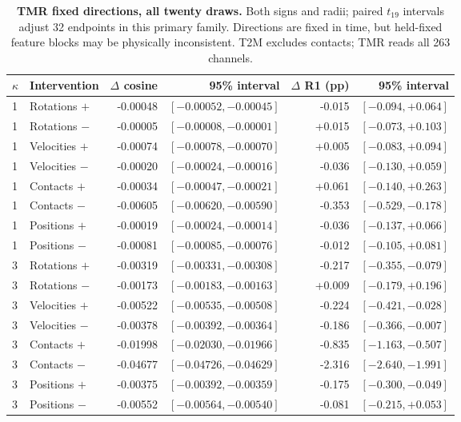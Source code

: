 \begin{table}[t]
\centering\small
\caption{\textbf{TMR fixed directions, all twenty draws.} Both signs and radii; paired $t_{19}$ intervals adjust 32 endpoints in this primary family. Directions are fixed in time, but held-fixed feature blocks may be physically inconsistent. T2M excludes contacts; TMR reads all 263 channels.}\label{tab:table_coherent_tmr_fixed}
\begin{tabular}{@{}llrrrr@{}}\toprule
$\kappa$&Intervention&$\Delta$ cosine&95\% interval&$\Delta$ R1 (pp)&95\% interval\\\midrule
1&Rotations $+$&-0.00048&$[-0.00052,-0.00045]$&-0.015&$[-0.094,+0.064]$\\
1&Rotations $-$&-0.00005&$[-0.00008,-0.00001]$&+0.015&$[-0.073,+0.103]$\\
1&Velocities $+$&-0.00074&$[-0.00078,-0.00070]$&+0.005&$[-0.083,+0.094]$\\
1&Velocities $-$&-0.00020&$[-0.00024,-0.00016]$&-0.036&$[-0.130,+0.059]$\\
1&Contacts $+$&-0.00034&$[-0.00047,-0.00021]$&+0.061&$[-0.140,+0.263]$\\
1&Contacts $-$&-0.00605&$[-0.00620,-0.00590]$&-0.353&$[-0.529,-0.178]$\\
1&Positions $+$&-0.00019&$[-0.00024,-0.00014]$&-0.036&$[-0.137,+0.066]$\\
1&Positions $-$&-0.00081&$[-0.00085,-0.00076]$&-0.012&$[-0.105,+0.081]$\\
3&Rotations $+$&-0.00319&$[-0.00331,-0.00308]$&-0.217&$[-0.355,-0.079]$\\
3&Rotations $-$&-0.00173&$[-0.00183,-0.00163]$&+0.009&$[-0.179,+0.196]$\\
3&Velocities $+$&-0.00522&$[-0.00535,-0.00508]$&-0.224&$[-0.421,-0.028]$\\
3&Velocities $-$&-0.00378&$[-0.00392,-0.00364]$&-0.186&$[-0.366,-0.007]$\\
3&Contacts $+$&-0.01998&$[-0.02030,-0.01966]$&-0.835&$[-1.163,-0.507]$\\
3&Contacts $-$&-0.04677&$[-0.04726,-0.04629]$&-2.316&$[-2.640,-1.991]$\\
3&Positions $+$&-0.00375&$[-0.00392,-0.00359]$&-0.175&$[-0.300,-0.049]$\\
3&Positions $-$&-0.00552&$[-0.00564,-0.00540]$&-0.081&$[-0.215,+0.053]$\\
\bottomrule\end{tabular}\end{table}
